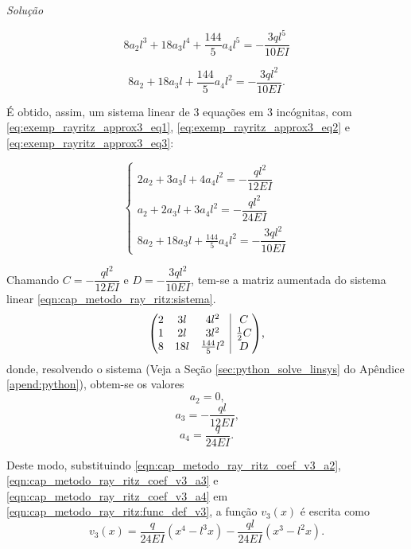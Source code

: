 \documentclass[
	12pt,				%
	openright,			%
    twoside,			%
	a4paper,			%
	chapter=TITLE,		%
	english,			%
	french,				%
	spanish,			%
	brazil				%
	]{abntex2}
\makeatletter
\newenvironment{amatrix}[1]{%
	\left(\begin{array}{@{}*{#1}{c}|c@{}}
}{%
	\end{array}\right)
}
\renewenvironment{proof}[1][\proofname]{
	\par\pushQED{\qed}%
	\normalfont \topsep6\p@\@plus6\p@\relax
	\trivlist
	\item\relax
		{\itshape
			#1\@addpunct{.}}\hspace\labelsep\ignorespaces
}{%
	\popQED\endtrivlist\@endpefalse
}
\newenvironment{solution}{
	\begin{proof}[Solução]
}{%
	\end{proof}
}
\numberwithin{lema}{chapter}
\numberwithin{teorema}{chapter}
\numberwithin{definicao}{chapter}
\numberwithin{exemplo}{chapter}
\numberwithin{figure}{chapter}
\makeatother
\begin{document}
\begin{solution}
	$$
		8a_2 l^3 + 18 a_3 l^4 + \frac{144}{5} a_4 l^5
		=
		-\frac{3ql^5}{10EI}
	$$
	
	\begin{equation}
		\label{eq:exemp_rayritz_approx3_eq3}
		8a_2 + 18a_3 l + \frac{144}{5} a_4 l^2 
		=
		-\frac{3ql^2}{10EI}
		\text{.}
	\end{equation}
	
	É obtido, assim, um sistema linear de 3 equações em 3 incógnitas, com \eqref{eq:exemp_rayritz_approx3_eq1}, \eqref{eq:exemp_rayritz_approx3_eq2} e \eqref{eq:exemp_rayritz_approx3_eq3}:
	
	\begin{equation}
		\label{eqn:cap_metodo_ray_ritz:sistema}
		\begin{cases}
			2a_2 + 3a_3l + 4a_4l^2 = -\dfrac{ql^2}{12EI}\\[10pt]
			a_2 + 2a_3 l + 3a_4 l^2 = - \dfrac{ql^2}{24EI}\\[10pt]
			8a_2 + 18a_3 l + \frac{144}{5} a_4 l^2 = -\dfrac{3ql^2}{10EI}
		\end{cases}
	\end{equation}
	
	Chamando $C=-\dfrac{ql^2}{12EI}$ e $D=-\dfrac{3ql^2}{10EI}$, tem-se a matriz aumentada do sistema linear \eqref{eqn:cap_metodo_ray_ritz:sistema}.
	\begin{equation}
		\label{eqn:cap_metodo_ray_ritz:matriz_sistema}
		\begin{amatrix}{3}
			2	& 	3l	&	4l^2 				& C \\
			1	& 	2l	&	3l^2			 	& \frac{1}{2}C \\
			8 	& 	18l & 	\frac{144}{5} l^2	& D
		\end{amatrix}
		\text{,}
	\end{equation}
	donde, resolvendo o sistema (Veja a Seção \ref{sec:python_solve_linsys} do Apêndice \ref{apend:python}), obtem-se os valores
	\begin{equation}
		\label{eqn:cap_metodo_ray_ritz_coef_v3_a2}
		a_2=0\text{,}
	\end{equation}
	\begin{equation}
		\label{eqn:cap_metodo_ray_ritz_coef_v3_a3}
		a_3=-\frac{ql}{12EI}\text{,}
	\end{equation}
	\begin{equation}
		\label{eqn:cap_metodo_ray_ritz_coef_v3_a4}
		a_4=\frac{q}{24EI}\text{.}
	\end{equation}
		
	Deste modo, substituindo \eqref{eqn:cap_metodo_ray_ritz_coef_v3_a2}, \eqref{eqn:cap_metodo_ray_ritz_coef_v3_a3} e \eqref{eqn:cap_metodo_ray_ritz_coef_v3_a4} em \eqref{eqn:cap_metodo_ray_ritz:func_def_v3}, a função $v_3(x)$ é escrita como
	\begin{equation}
		\label{eqn:cap_metodo_ray_ritz:func_v3}
		v_3(x) =
		\frac{q}{24EI} ( x^4 - l^3 x )
		-
		\frac{ql}{24EI} ( x^3 - l^2 x )
		\text{.}
	\end{equation}
	

\end{solution}
\end{document}
